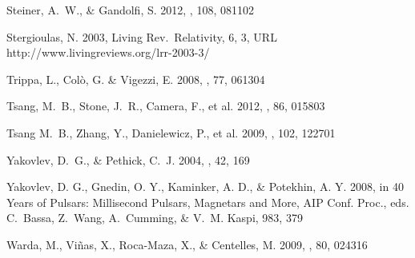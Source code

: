 \documentclass{aa}
\begin{document}
\begin{thebibliography}{}
Steiner, A.~W., \& Gandolfi, S. 
2012, 
\prl, 108, 081102 

Stergioulas, N. 2003, Living Rev.\ Relativity, 6, 3,
URL http://www.\linebreak[1]livingreviews.\linebreak[1]org/lrr-2003-3/
 
Trippa, L., Col{\`o}, G. \& Vigezzi, E. 
2008,
\prc, 77, 061304

Tsang, M.~B., Stone, J.~R., Camera, F., et al. 
2012, 
\prc, 86, 015803 

Tsang M.~B., Zhang, Y., Danielewicz, P., et al. 2009, 
\prl, 102, 122701

Yakovlev, D.~G., \& Pethick, C.~J.
2004,
\araa, 42, 169

Yakovlev, D. G., Gnedin, O. Y., Kaminker, A. D., \& Potekhin, A. Y.
2008, 
in
40 Years of Pulsars: Millisecond Pulsars, Magnetars and More, 
AIP Conf. Proc.,
eds. C.~Bassa, Z.~Wang, A.~Cumming, \& V.~M. Kaspi,
983, 379

Warda, M., Vi{\~n}as, X., Roca-Maza, X., \& Centelles, M. 
2009, 
\prc, 80, 024316 

\end{thebibliography}
\end{document}
